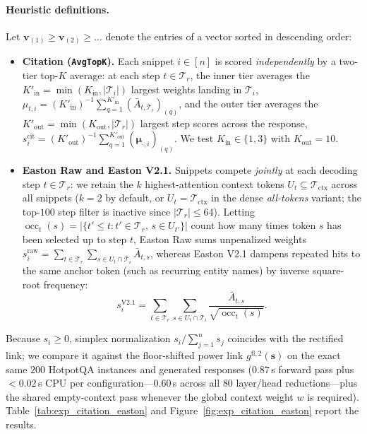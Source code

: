 \paragraph{Heuristic definitions.}
Let $\mathbf{v}_{(1)} \ge \mathbf{v}_{(2)} \ge \dots$ denote the entries of a vector sorted in descending order:
\begin{itemize}
    \item \textbf{Citation (\texttt{AvgTopK}).} Each snippet $i \in [n]$ is scored \emph{independently} by a two-tier top-$K$ average: at each step $t \in \mathcal{T}_r$, the inner tier averages the $K'_{\text{in}} = \min(K_{\text{in}}, |\mathcal{T}_i|)$ largest weights landing in $\mathcal{T}_i$, $\mu_{t, i} = (K'_{\text{in}})^{-1} \sum_{q=1}^{K'_{\text{in}}} (\bar{A}_{t, \mathcal{T}_i})_{(q)}$, and the outer tier averages the $K'_{\text{out}} = \min(K_{\text{out}}, |\mathcal{T}_r|)$ largest step scores across the response, $s_i^{\text{cit}} = (K'_{\text{out}})^{-1} \sum_{q=1}^{K'_{\text{out}}} (\boldsymbol{\mu}_{\cdot, i})_{(q)}$. We test $K_{\text{in}} \in \{1, 3\}$ with $K_{\text{out}} = 10$.
    \item \textbf{Easton Raw and Easton V2.1.} Snippets compete \emph{jointly} at each decoding step $t \in \mathcal{T}_r$: we retain the $k$ highest-attention context tokens $U_t \subseteq \mathcal{T}_{\text{ctx}}$ across all snippets ($k = 2$ by default, or $U_t = \mathcal{T}_{\text{ctx}}$ in the dense \emph{all-tokens} variant; the top-$100$ step filter is inactive since $|\mathcal{T}_r| \le 64$). Letting $\operatorname{occ}_t(s) = |\{t' \le t : t' \in \mathcal{T}_r,\, s \in U_{t'}\}|$ count how many times token $s$ has been selected up to step $t$, Easton Raw sums unpenalized weights $s_i^{\text{raw}} = \sum_{t \in \mathcal{T}_r} \sum_{s \in U_t \cap \mathcal{T}_i} \bar{A}_{t, s}$, whereas Easton V2.1 dampens repeated hits to the same anchor token (such as recurring entity names) by inverse square-root frequency:
    \[
        s_i^{\text{V2.1}} = \sum_{t \in \mathcal{T}_r} \sum_{s \in U_t \cap \mathcal{T}_i} \frac{\bar{A}_{t, s}}{\sqrt{\operatorname{occ}_t(s)}}.
    \]
\end{itemize}
Because $s_i \ge 0$, simplex normalization $s_i / \sum_{j=1}^n s_j$ coincides with the rectified link; we compare it against the floor-shifted power link $g^{\text{fl},2}(\mathbf{s})$ on the exact same $200$ HotpotQA instances and generated responses ($0.87$\,s forward pass plus $< 0.02$\,s CPU per configuration---$0.60$\,s across all $80$ layer/head reductions---plus the shared empty-context pass whenever the global context weight $w$ is required). Table~\ref{tab:exp_citation_easton} and Figure~\ref{fig:exp_citation_easton} report the results.

